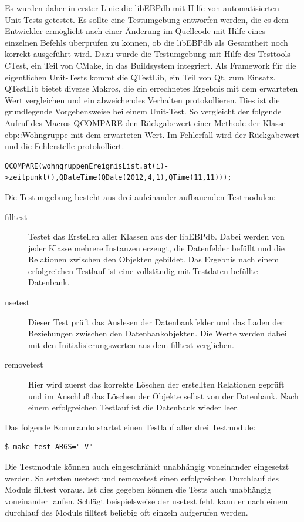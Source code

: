 Es wurden daher in erster Linie die libEBPdb mit Hilfe von automatisierten Unit-Tests getestet. Es sollte eine Testumgebung entworfen werden, die es
dem Entwickler ermöglicht nach einer Änderung im Quellcode mit Hilfe eines einzelnen Befehls überprüfen zu können, ob die libEBPdb als Gesamtheit noch
korrekt ausgeführt wird. Dazu wurde die Testumgebung mit Hilfe des Testtools CTest, ein Teil von CMake, in das Buildsystem integriert. Als Framework
für die eigentlichen Unit-Tests kommt die QTestLib, ein Teil von Qt, zum Einsatz. QTestLib bietet diverse Makros, die ein errechnetes Ergebnis mit dem
erwarteten Wert vergleichen und ein abweichendes Verhalten protokollieren. Dies ist die grundlegende Vorgehensweise bei einem Unit-Test. So
vergleicht der folgende Aufruf des Macros QCOMPARE den Rückgabewert einer Methode der Klasse ebp::Wohngruppe mit dem erwarteten Wert. Im Fehlerfall
wird der Rückgabewert und die Fehlerstelle protokolliert.
\begin{lstlisting}
QCOMPARE(wohngruppenEreignisList.at(i)->zeitpunkt(),QDateTime(QDate(2012,4,1),QTime(11,11)));
\end{lstlisting}
Die Testumgebung besteht aus drei aufeinander aufbauenden Testmodulen:
\begin{description}
 \item [fill\textunderscore test] Testet das Erstellen aller Klassen aus der libEBPdb. Dabei werden von jeder Klasse mehrere Instanzen erzeugt, die
Datenfelder befüllt und die Relationen zwischen den Objekten gebildet. Das Ergebnis nach einem erfolgreichen Testlauf ist eine vollständig mit
Testdaten befüllte Datenbank.
 \item [use\textunderscore test] Dieser Test prüft das Auslesen der Datenbankfelder und das Laden der Beziehungen zwischen den Datenbankobjekten. Die
Werte werden dabei mit den Initialisierungswerten aus dem fill\textunderscore test verglichen.
 \item [remove\textunderscore test] Hier wird zuerst das korrekte Löschen der erstellten Relationen geprüft und im Anschluß das Löschen der Objekte
selbst von der Datenbank. Nach einem erfolgreichen Testlauf ist die Datenbank wieder leer.
\end{description}
Das folgende Kommando startet einen Testlauf aller drei Testmodule:
\begin{lstlisting}
$ make test ARGS="-V"
\end{lstlisting}
Die Testmodule können auch eingeschränkt unabhängig voneinander eingesetzt werden. So setzten use\textunderscore test und remove\textunderscore test
einen erfolgreichen Durchlauf des Moduls fill\textunderscore test voraus. Ist dies gegeben können die Tests auch unabhängig voneinander laufen.
Schlägt beispielsweise der use\textunderscore test fehl, kann er nach einem durchlauf des Moduls fill\textunderscore test beliebig oft einzeln
aufgerufen werden.


